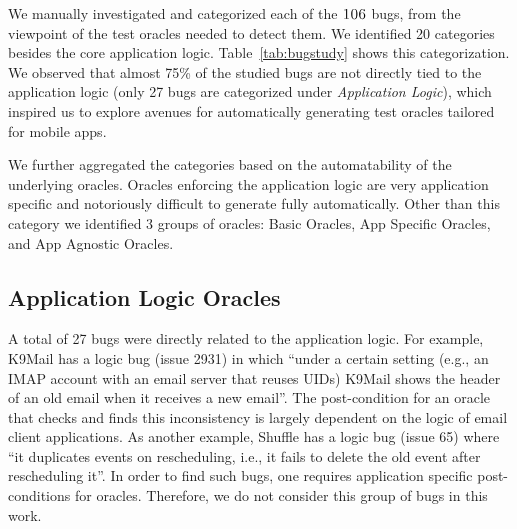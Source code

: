 We manually investigated and categorized each of the $\textsc{106}$ bugs, from the viewpoint of the test oracles needed to detect them. We identified 20 categories besides the core application logic. Table~\ref{tab:bugstudy} shows this categorization. %
We observed that almost 75\% of the studied bugs are not directly tied to the application logic (only 27 bugs are categorized under \emph{Application Logic}), which inspired us to explore avenues for automatically generating test oracles tailored for mobile apps.

We further aggregated the categories based on the automatability of the underlying oracles. Oracles enforcing the application logic are very application specific and notoriously difficult to generate fully automatically. Other than this category we identified $3$ groups of oracles: Basic Oracles, App Specific Oracles, and App Agnostic Oracles.

\subsection{Application Logic Oracles}
\label{applicationLogicOracles}
A total of 27 bugs were directly related to the application logic. For example, K9Mail has a logic bug (issue 2931) in which ``under a certain setting (e.g., an IMAP account with an email server that reuses UIDs) K9Mail shows the header of an old email when it receives a new email''. The post-condition for an oracle that checks and finds this inconsistency is largely dependent on the logic of email client applications. As another example, Shuffle has a logic bug (issue 65) where ``it duplicates events on rescheduling, i.e., it fails to delete the old event after rescheduling it''. In order to find such bugs, one requires application specific post-conditions for oracles. Therefore, we do not consider this group of bugs in this work.


